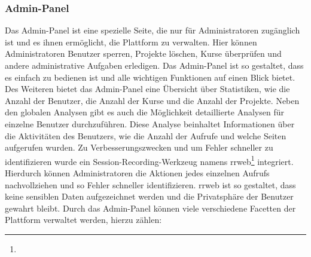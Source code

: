 \documentclass[main.tex]{subfiles}
\begin{document}
    \subsubsection{Admin-Panel}
    Das Admin-Panel ist eine spezielle Seite, die nur für Administratoren zugänglich ist und es ihnen ermöglicht, die Plattform zu verwalten.
    Hier können Administratoren Benutzer sperren, Projekte löschen, Kurse überprüfen und andere administrative Aufgaben erledigen.
    Das Admin-Panel ist so gestaltet, dass es einfach zu bedienen ist und alle wichtigen Funktionen auf einen Blick bietet.
    Des Weiteren bietet das Admin-Panel eine Übersicht über Statistiken, wie die Anzahl der Benutzer, die Anzahl der Kurse und die Anzahl der Projekte.
    Neben den globalen Analysen gibt es auch die Möglichkeit detaillierte Analysen für einzelne Benutzer durchzuführen.
    Diese Analyse beinhaltet Informationen über die Aktivitäten des Benutzers, wie die Anzahl der Aufrufe und welche Seiten aufgerufen wurden.
    Zu Verbesserungszwecken und um Fehler schneller zu identifizieren wurde ein Session-Recording-Werkzeug namens rrweb\footnote{} integriert.
    Hierdurch können Administratoren die Aktionen jedes einzelnen Aufrufs nachvollziehen und so Fehler schneller identifizieren.
    rrweb ist so gestaltet, dass keine sensiblen Daten aufgezeichnet werden und die Privatsphäre der Benutzer gewahrt bleibt.
    Durch das Admin-Panel können viele verschiedene Facetten der Plattform verwaltet werden, hierzu zählen:
\end{document}
